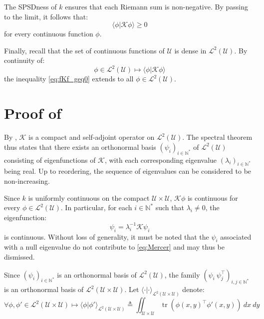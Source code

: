 The SPSDness of $k$ ensures that each Riemann sum is non-negative. By passing to the limit, it follows that:
\begin{equation}
	\langle\phi|\mathcal{K}\phi\rangle\geq0\label{eq:fKf_geq0}
\end{equation}
for every continuous function $\phi$.

Finally, recall that the set of continuous functions of $\mathcal{U}$ is dense in $\mathcal{L}^2(\mathcal{U})$. By continuity of:
\begin{equation}
	\phi\in\mathcal{L}^2(\mathcal{U})\mapsto\langle\phi|\mathcal{K}\phi\rangle
\end{equation}
the inequality \eqref{eq:fKf_geq0} extends to all $\phi\in\mathcal{L}^2(\mathcal{U})$.

\section[Proof of Proposition 3.11]{Proof of }\label{sec:proof_Mercer}

By , $\mathcal{K}$ is a compact and self-adjoint operator on $\mathcal{L}^2(\mathcal{U})$. The spectral theorem \cite{bib:spectral-theorem} thus states that there exists an orthonormal basis $(\psi_i)_{i\in\mathbb{N}^*}$ of $\mathcal{L}^2(\mathcal{U})$ consisting of eigenfunctions of $\mathcal{K}$, with each corresponding eigenvalue $(\lambda_i)_{i\in\mathbb{N}^*}$ being real. Up to reordering, the sequence of eigenvalues can be considered to be non-increasing.

Since $k$ is uniformly continuous on the compact $\mathcal{U}\times\mathcal{U}$, $\mathcal{K}\phi$ is continuous for every $\phi\in\mathcal{L}^2(\mathcal{U})$. In particular, for each $i\in\mathbb{N}^*$ such that $\lambda_i\neq0$, the eigenfunction:
\begin{equation}
	\psi_i=\lambda_i^{-1}\mathcal{K}\psi_i
\end{equation}
is continuous. Without loss of generality, it must be noted that the $\psi_i$ associated with a null eigenvalue do not contribute to \eqref{eq:Mercer} and may thus be dismissed.

Since $(\psi_i)_{i\in\mathbb{N}^*}$ is an orthonormal basis of $\mathcal{L}^2(\mathcal{U})$, the family $(\psi_i\:\psi_j^\top)_{i,j\in\mathbb{N}^*}$ is an orthonormal basis of $\mathcal{L}^2(\mathcal{U}\times\mathcal{U})$. Let $\langle\cdot|\cdot\rangle_{\mathcal{L}^2(\mathcal{U}\times\mathcal{U})}$ denote:
\begin{equation}
	\forall\phi,\phi'\in\mathcal{L}^2(\mathcal{U}\times\mathcal{U})\mapsto\langle\phi|\phi'\rangle_{\mathcal{L}^2(\mathcal{U}\times\mathcal{U})}\triangleq\iint_{\mathcal{U}\times\mathcal{U}}{\operatorname{tr}\left(\phi(x,y)^\top\phi'(x,y)\right)\:dx\:dy}
\end{equation}


